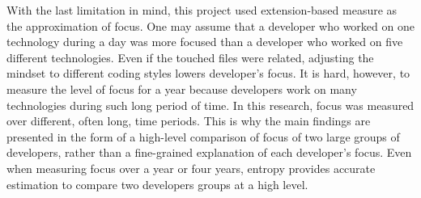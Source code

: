 With the last limitation in mind, this project used extension-based measure as the approximation of focus. One may assume that a developer who worked on one technology during a day was more focused than a developer who worked on five different technologies. Even if the touched files were related, adjusting the mindset to different coding styles lowers developer’s focus. It is hard, however, to measure the level of focus for a year because developers work on many technologies during such long period of time. In this research, focus was measured over different, often long, time periods. This is why the main findings are presented in the form of a high-level comparison of focus of two large groups of developers, rather than a fine-grained explanation of each developer’s focus. Even when measuring focus over a year or four years, entropy provides accurate estimation to compare two developers groups at a high level. \par


